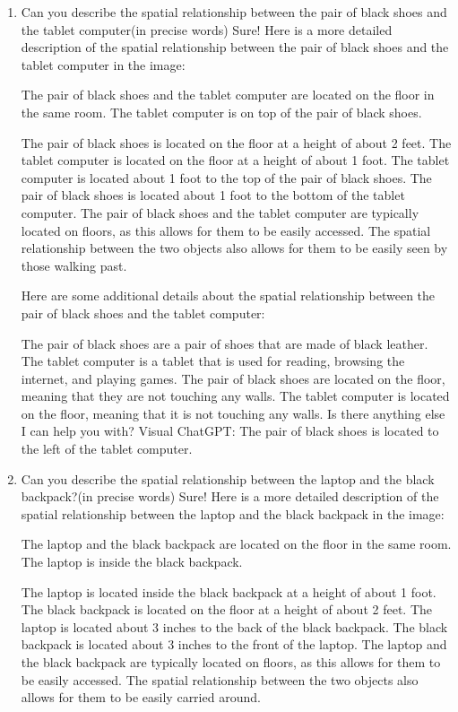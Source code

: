 \begin{enumerate}
    \item Can you describe the spatial relationship between the pair of black shoes and the tablet computer(in precise words)
    \subitem Sure! Here is a more detailed description of the spatial relationship between the pair of black shoes and the tablet computer in the image:

    The pair of black shoes and the tablet computer are located on the floor in the same room. The tablet computer is on top of the pair of black shoes.
    
    The pair of black shoes is located on the floor at a height of about 2 feet.
    The tablet computer is located on the floor at a height of about 1 foot.
    The tablet computer is located about 1 foot to the top of the pair of black shoes.
    The pair of black shoes is located about 1 foot to the bottom of the tablet computer.
    The pair of black shoes and the tablet computer are typically located on floors, as this allows for them to be easily accessed. The spatial relationship between the two objects also allows for them to be easily seen by those walking past.
    
    Here are some additional details about the spatial relationship between the pair of black shoes and the tablet computer:
    
    The pair of black shoes are a pair of shoes that are made of black leather.
    The tablet computer is a tablet that is used for reading, browsing the internet, and playing games.
    The pair of black shoes are located on the floor, meaning that they are not touching any walls.
    The tablet computer is located on the floor, meaning that it is not touching any walls.
    Is there anything else I can help you with?
    \subitem Visual ChatGPT: The pair of black shoes is located to the left of the tablet computer.
    \item Can you describe the spatial relationship between the laptop and the black backpack?(in precise words)
    \subitem 
    Sure! Here is a more detailed description of the spatial relationship between the laptop and the black backpack in the image:
    
    The laptop and the black backpack are located on the floor in the same room. The laptop is inside the black backpack.
    
    The laptop is located inside the black backpack at a height of about 1 foot.
    The black backpack is located on the floor at a height of about 2 feet.
    The laptop is located about 3 inches to the back of the black backpack.
    The black backpack is located about 3 inches to the front of the laptop.
    The laptop and the black backpack are typically located on floors, as this allows for them to be easily accessed. The spatial relationship between the two objects also allows for them to be easily carried around.
    

\end{enumerate}
